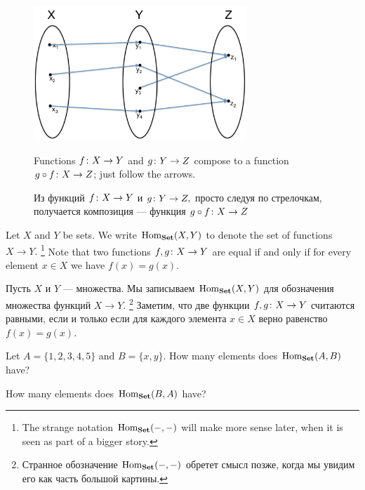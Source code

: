 \documentclass[CT4S-EN-RU]{subfiles}
\begin{document}
\begin{figure}[h]
\begin{center}
\includegraphics[height=2in]{composition}
\end{center}
\begin{blockENG}
\caption{Functions $f\colon X\rightarrow Y$ and $g\colon Y\rightarrow Z$ compose to a function $g\circ f\colon X\rightarrow Z$; just follow the arrows.}
\end{blockENG}
\begin{blockRUS}
\caption{Из функций $f\colon X\rightarrow Y$ и $g\colon Y\rightarrow Z,$ просто следуя по стрелочкам, получается композиция — функция $g\circ f\colon X\rightarrow Z$}
\end{blockRUS}
\end{figure}

\begin{blockENG}
Let $X$ and $Y$ be sets. We write $\textnormal{Hom}_{\mathbf{Set}}(X,Y)$ to denote the set of functions $X\to Y.$%
\footnote{The strange notation $\textnormal{Hom}_{\mathbf{Set}}(-,-)$ will make more sense later, when it is seen as part of a bigger story.} 
Note that two functions $f,g\colon X\rightarrow Y$ are equal if and only if for every element $x\in X$ we have $f(x)=g(x).$ 
\end{blockENG}

\begin{blockRUS}
Пусть $X$ и $Y$ — множества. Мы записываем $\textnormal{Hom}_{\mathbf{Set}}(X,Y)$ для обозначения множества функций $X\to Y.$%
\footnote{Странное обозначение $\textnormal{Hom}_{\mathbf{Set}}(-,-)$ обретет смысл позже, когда мы увидим его как часть большой картины.} 
Заметим, что две функции $f,g\colon X\rightarrow Y$ считаются равными, если и только если для каждого элемента $x\in X$ верно равенство $f(x)=g(x).$ 
\end{blockRUS}

\begin{exerciseENG}
Let $A=\{1,2,3,4,5\}$ and $B=\{x,y\}.$ 
\sexc How many elements does $\textnormal{Hom}_{\mathbf{Set}}(A,B)$ have? 
\item How many elements does $\textnormal{Hom}_{\mathbf{Set}}(B,A)$ have?
\endsexc
\end{exerciseENG}
\end{document}
